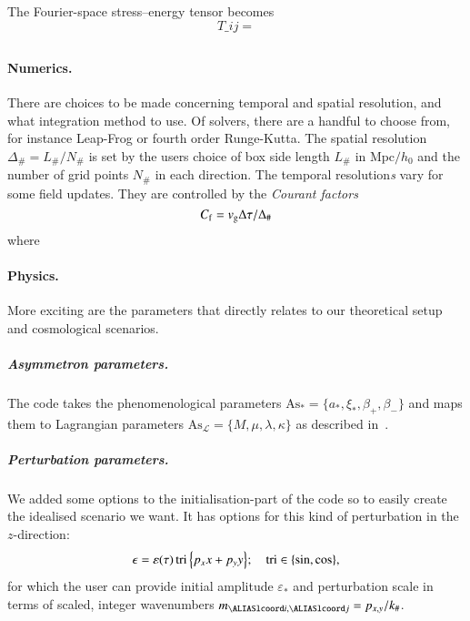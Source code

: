 \begin{draft}
    The Fourier-space stress--energy tensor becomes
    \begin{equation}
        T\_{ij} = 
    \end{equation}

    


\subsection{}

    
    \paragraph{Numerics.} %
    There are choices to be made concerning temporal and spatial resolution, and what integration method to use. Of solvers, there are a handful to choose from, for instance Leap-Frog or fourth order Runge-Kutta. The spatial resolution $\Delta_\#= L_\#/N_\#$ is set by the users choice of box side length $L_\# $ in $\text{Mpc}/h_0$ and the number of grid points $N_\#$ in each direction. The temporal resolution\emph{s} vary for some field updates. They are controlled by the \emph{Courant factors}
    \begin{equation}
        C_\mathrm{f} = v_\mathrm{g} \Delta \tau / \Delta_\#
    \end{equation}
    where \blahblah


    
    \paragraph{Physics.} %
    More exciting are the parameters that directly relates to our theoretical setup and cosmological scenarios. %
        \subparagraph{Asymmetron parameters.} %
        The code takes the phenomenological parameters $\mathrm{As}_\ast = \{a_\ast, \xi_\ast, \beta_+, \beta_- \}$ and maps them to Lagrangian parameters $\mathrm{As}_\mathcal{L} = \{ M, \mu, \lambda, \kappa \}$ as described in~.


        \subparagraph{Perturbation parameters.} %
        We added some options to the initialisation-part of the code so to easily create the idealised scenario we want. It has options for this kind of perturbation in the $z$-direction:
        \begin{equation}
            \epsilon = \varepsilon(\tau) \mathop{\mathrm{tri}}{{\left\{  p_x x + p_y y  \right\}}}; \quad \mathop{\mathrm{tri}} \in \{ \sin, \cos \},
        \end{equation}
        for which the user can provide initial amplitude $\varepsilon_\ast$ and perturbation scale in terms of scaled, integer wavenumbers $m_{\lcoord{i},\lcoord{j}} = p_{x,y} /k_\#$. 


\end{draft}
